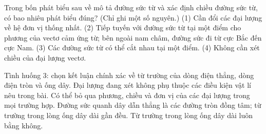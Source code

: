 \begin{ex}
Trong bốn phát biểu sau về mô tả đường sức từ và xác định chiều đường sức từ, có bao nhiêu phát biểu đúng? (Chỉ ghi một số nguyên.) (1) Cần đổi các đại lượng về hệ đơn vị thống nhất. (2) Tiếp tuyến với đường sức từ tại một điểm cho phương của vectơ cảm ứng từ; bên ngoài nam châm, đường sức đi từ cực Bắc đến cực Nam. (3) Các đường sức từ có thể cắt nhau tại một điểm. (4) Không cần xét chiều của đại lượng vectơ.
\end{ex}

\begin{ex}
Tình huống 3: chọn kết luận chính xác về từ trường của dòng điện thẳng, dòng điện tròn và ống dây.
\choice
{Đại lượng đang xét không phụ thuộc các điều kiện vật lí nêu trong bài.}
{Có thể bỏ qua phương, chiều và đơn vị của các đại lượng trong mọi trường hợp.}
{\True Đường sức quanh dây dẫn thẳng là các đường tròn đồng tâm; từ trường trong lòng ống dây dài gần đều.}
{Từ trường trong lòng ống dây dài luôn bằng không.}
\end{ex}

